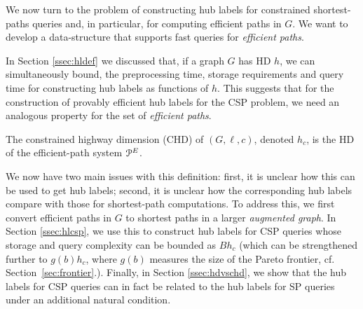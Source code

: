We now turn to the problem of constructing hub labels for constrained shortest-paths queries and, in particular, for computing efficient paths in $G$. 
We want to develop a data-structure that supports fast queries for \emph{efficient paths}. 

In Section \ref{ssec:hldef} we discussed that, if a graph $G$ has HD $h$, we can simultaneously bound, the preprocessing time, storage requirements and query time for constructing hub labels as functions of $h$.
This suggests that for the construction of provably efficient hub labels for the CSP problem, we need an analogous property for the set of \emph{efficient paths}.
\begin{definition} The constrained highway dimension (CHD) of $(G,\ell,c)$, denoted $h_c$, is the HD of the efficient-path system $\mathcal{P}^E$.
\end{definition}

We now have two main issues with this definition: first, it is unclear how this can be used to get hub labels; second, it is unclear how the corresponding hub labels compare with those for shortest-path computations. 
To address this, we first convert efficient paths in $G$ to shortest paths in a larger \emph{augmented graph}. 
In Section \ref{ssec:hlcsp}, we use this to construct hub labels for CSP queries whose storage and query complexity can be bounded as $Bh_c$ (which can be strengthened further to $g(b)h_c$, where $g(b)$ measures the size of the Pareto frontier, cf. Section~\ref{sec:frontier}.). 
Finally, in Section \ref{ssec:hdvschd}, we show that the hub labels for CSP queries can in fact be related to the hub labels for SP queries under an additional natural condition.